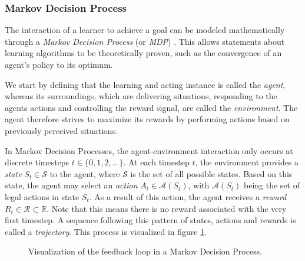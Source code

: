 \subsubsection{Markov Decision Process}
The interaction of a learner to achieve a goal can be modeled mathematically through a \textit{Markov Decision Process} (or \textit{MDP}) \cite{bible}. This allows statements about learning algorithms to be theoretically proven, such as the convergence of an agent's policy to its optimum.

We start by defining that the learning and acting instance is called the \textit{agent}, whereas its surroundings, which are delivering situations, responding to the agents actions and controlling the reward signal, are called the \textit{environment}. The agent therefore strives to maximize its rewards by performing actions based on previously perceived situations. 

In Markov Decision Processes, the agent-environment interaction only occurs at discrete timesteps $t \in \{0, 1, 2, ...\}$. At each timestep $t$, the environment provides a \textit{state} $S_t \in \mathscr{S}$ to the agent, where $\mathscr{S}$ is the set of all possible states. Based on this state, the agent may select an \textit{action} $A_t \in \mathscr{A}(S_t)$, with $\mathscr{A}(S_t)$ being the set of legal actions in state $S_t$. As a result of this action, the agent receives a \textit{reward} $R_t \in \mathscr{R} \subset \mathbb{R}$. Note that this means there is no reward associated with the very first timestep. A sequence following this pattern of states, actions and rewards is called a \textit{trajectory}. This process is visualized in figure \ref{fig:mdp_visualization}.

\begin{figure}[ht]
    \centering
    \caption{Visualization of the feedback loop in a Markov Decision Process.}
    \label{fig:mdp_visualization}
\end{figure}

